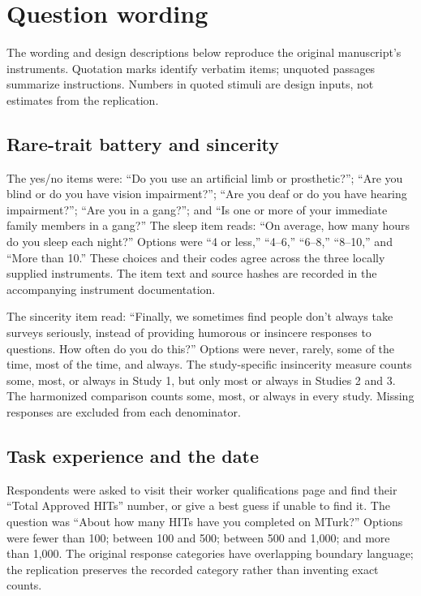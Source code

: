 \documentclass[11pt]{article}
\begin{document}


\section{Question wording}
\begingroup\small{}

The wording and design descriptions below reproduce the original manuscript's instruments. Quotation marks identify verbatim items; unquoted passages summarize instructions. Numbers in quoted stimuli are design inputs, not estimates from the replication.

\subsection{Rare-trait battery and sincerity}

The yes/no items were: ``Do you use an artificial limb or prosthetic?''; ``Are you blind or do you have vision impairment?''; ``Are you deaf or do you have hearing impairment?''; ``Are you in a gang?''; and ``Is one or more of your immediate family members in a gang?'' The sleep item reads: ``On average, how many hours do you sleep each night?'' Options were ``4 or less,'' ``4--6,'' ``6--8,'' ``8--10,'' and ``More than 10.'' These choices and their codes agree across the three locally supplied instruments. The item text and source hashes are recorded in the accompanying instrument documentation.

The sincerity item read: ``Finally, we sometimes find people don't always take surveys seriously, instead of providing humorous or insincere responses to questions. How often do you do this?'' Options were never, rarely, some of the time, most of the time, and always. The study-specific insincerity measure counts some, most, or always in Study 1, but only most or always in Studies 2 and 3. The harmonized comparison counts some, most, or always in every study. Missing responses are excluded from each denominator.

\subsection{Task experience and the date}

Respondents were asked to visit their worker qualifications page and find their ``Total Approved HITs'' number, or give a best guess if unable to find it. The question was ``About how many HITs have you completed on MTurk?'' Options were fewer than 100; between 100 and 500; between 500 and 1,000; and more than 1,000. The original response categories have overlapping boundary language; the replication preserves the recorded category rather than inventing exact counts.
\end{document}
